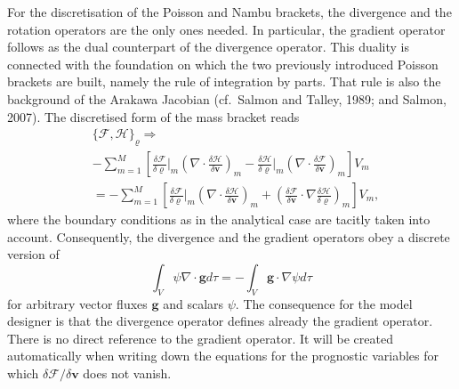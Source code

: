 For the discretisation of the Poisson and Nambu brackets, the divergence and the rotation operators are the only ones needed.
In particular, the gradient operator follows as the dual counterpart of the divergence operator. This duality is connected with the foundation on which the two previously introduced Poisson brackets are built, namely the rule of integration by parts. That rule is also the background of the Arakawa Jacobian (cf.~Salmon and Talley, 1989; and Salmon, 2007). The discretised form of the mass bracket reads
\begin{align}
& \{\mathcal{F},\mathcal{H}\}_{\varrho}\Rightarrow\label{massbracket}\\
&-\sum_{m=1}^M\left[
\frac{\delta\mathcal{F}}{\delta\varrho}\Big|_m\left(\nabla\cdot\frac{\delta\mathcal{H}}{\delta\mathbf{v}}\right)_m
-\frac{\delta\mathcal{H}}{\delta\varrho}\Big|_m\left(\nabla\cdot\frac{\delta\mathcal{F}}{\delta\mathbf{v}}\right)_m
\right]V_m\nonumber\\
&=-\sum_{m=1}^M\left[
\frac{\delta\mathcal{F}}{\delta\varrho}\Big|_m\left(\nabla\cdot\frac{\delta\mathcal{H}}{\delta\mathbf{v}}\right)_m
+\left(\frac{\delta\mathcal{F}}{\delta\mathbf{v}}\cdot\nabla\frac{\delta\mathcal{H}}{\delta\varrho}\right)_m
\right]V_m,\nonumber
\end{align}
where the boundary conditions as in the analytical case are tacitly taken into account.
Consequently, the divergence and the gradient operators obey a discrete version of
\begin{equation}
 \int_V \psi \nabla\cdot \mathbf{g} d\tau = -\int_V \mathbf{g}\cdot\nabla\psi d\tau
\end{equation}
for arbitrary vector fluxes $\mathbf{g}$ and scalars $\psi$. The consequence for the model designer is that the divergence operator defines already the gradient operator. There is no direct reference to the gradient operator. It will be created automatically when writing down the equations for the prognostic variables for which $\delta\mathcal{F}/\delta\mathbf{v}$
does not vanish.

